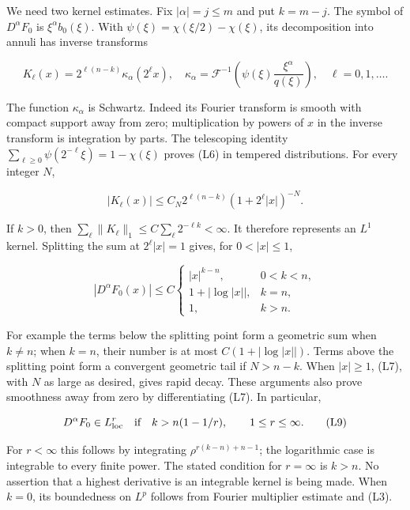 \documentclass[
  11pt,
]{article}
\begin{document}
We need two kernel estimates. Fix \(|\alpha|=j\leq m\) and put
\(k=m-j\). The symbol of \(D^\alpha F_0\) is \(\xi^\alpha b_0(\xi)\).
With \(\psi(\xi)=\chi(\xi/2)-\chi(\xi)\), its decomposition into annuli
has inverse transforms

\[
K_\ell(x)=2^{\ell(n-k)}\kappa_\alpha(2^\ell x),\quad
\kappa_\alpha=\mathcal F^{-1}\!\left(\psi(\xi)\frac{\xi^\alpha}{q(\xi)}\right),
\quad \ell=0,1,\ldots.                                             \tag{L6}
\]

The function \(\kappa_\alpha\) is Schwartz. Indeed its Fourier transform
is smooth with compact support away from zero; multiplication by powers
of \(x\) in the inverse transform is integration by parts. The
telescoping identity \(\sum_{\ell\geq0}\psi(2^{-\ell}\xi)=1-\chi(\xi)\)
proves (L6) in tempered distributions. For every integer \(N\),

\[
|K_\ell(x)|\leq C_N2^{\ell(n-k)}(1+2^\ell|x|)^{-N}.              \tag{L7}
\]

If \(k>0\), then
\(\sum_\ell\|K_\ell\|_1\leq C\sum_\ell2^{-\ell k}<\infty\). It therefore
represents an \(L^1\) kernel. Splitting the sum at \(2^\ell|x|=1\)
gives, for \(0<|x|\leq1\),

\[
|D^\alpha F_0(x)|\leq C
\begin{cases}
|x|^{k-n},&0<k<n,\\
1+|\log|x||,&k=n,\\
1,&k>n.
\end{cases}                                                       \tag{L8}
\]

For example the terms below the splitting point form a geometric sum
when \(k\ne n\); when \(k=n\), their number is at most
\(C(1+|\log|x||)\). Terms above the splitting point form a convergent
geometric tail if \(N>n-k\). When \(|x|\geq1\), (L7), with \(N\) as
large as desired, gives rapid decay. These arguments also prove
smoothness away from zero by differentiating (L7). In particular,

\[
D^\alpha F_0\in L^r_{\mathrm{loc}}
\quad\hbox{if}\quad k>n(1-1/r),\qquad 1\leq r\leq\infty.          \tag{L9}
\]

For \(r<\infty\) this follows by integrating \(\rho^{r(k-n)+n-1}\); the
logarithmic case is integrable to every finite power. The stated
condition for \(r=\infty\) is \(k>n\). No assertion that a highest
derivative is an integrable kernel is being made. When \(k=0\), its
boundedness on \(L^p\) follows from Fourier multiplier estimate and
(L3).
\end{document}
